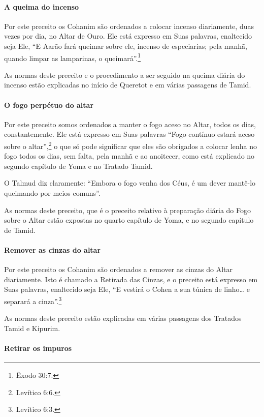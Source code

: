 \paragraph{A queima do incenso}

Por este preceito os Cohanim são ordenados a colocar incenso
diariamente, duas vezes por dia, no Altar de Ouro. Ele está expresso em
Suas palavras, enaltecido seja Ele, ``E Aarão fará queimar sobre ele,
incenso de especiarias; pela manhã, quando limpar as lamparinas, o
queimará''.\footnote{Êxodo 30:7.}

As normas deste preceito e o procedimento a ser seguido na queima diária
do incenso estão explicadas no início de Queretot e em várias passagens
de Tamid.

\paragraph{O fogo perpétuo do altar}

Por este preceito somos ordenados a manter o fogo aceso no Altar, todos
os dias, constantemente. Ele está expresso em Suas palavras ``Fogo
contínuo estará aceso sobre o altar'',\footnote{Levítico 6:6.} o que só pode
significar que eles são obrigados a colocar lenha no fogo todos os dias,
sem falta, pela manhã e ao anoitecer, como está explicado no segundo
capítulo de Yoma e no Tratado Tamid.

O Talmud diz claramente: ``Embora o fogo venha dos Céus, é um dever
mantê-lo queimando por meios comuns''.

As normas deste preceito, que é o preceito relativo à preparação diária
do Fogo sobre o Altar estão expostas no quarto capítulo de Yoma, e no
segundo capítulo de Tamid.

\paragraph{Remover as cinzas do altar}

Por este preceito os Cohanim são ordenados a remover as cinzas do
Altar diariamente. Isto é chamado a Retirada das Cinzas, e o preceito
está expresso em Suas palavras, enaltecido seja Ele, ``E vestirá o
Cohen a sua túnica de linho\ldots{} e separará a cinza''.\footnote{Levítico 6:3.}

As normas deste preceito estão explicadas em várias passagens dos
Tratados Tamid e Kipurim.

\paragraph{Retirar os impuros}

